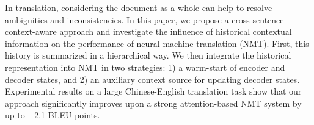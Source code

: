 In translation, considering the document as a whole can help to resolve ambiguities and inconsistencies. In this paper, we propose a cross-sentence context-aware approach and investigate the influence of historical contextual information on the performance of neural machine translation (NMT). First, this history is summarized in a hierarchical way. We then integrate the historical representation into NMT in two strategies: 1) a warm-start of encoder and decoder states, and 2) an auxiliary context source for updating decoder states. Experimental results on a large Chinese-English translation task show that our approach significantly improves upon a strong attention-based NMT system by up to +2.1 BLEU points.
